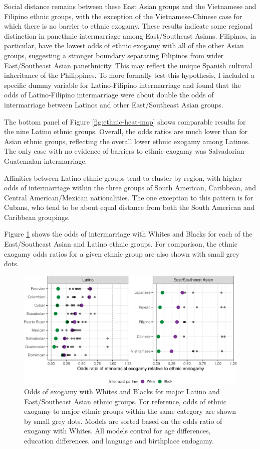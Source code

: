 \documentclass[11pt,]{article}
\begin{document}
Social distance remains between these East Asian groups and the Vietnamese and Filipino ethnic groups, with the exception of the Vietnamese-Chinese case for which there is no barrier to ethnic exogamy. These results indicate some regional distinction in panethnic intermarriage among East/Southeast Asians. Filipinos, in particular, have the lowest odds of ethnic exogamy with all of the other Asian groups, suggesting a stronger boundary separating Filipinos from wider East/Southeast Asian panethnicity. This may reflect the unique Spanish cultural inheritance of the Philippines. To more formally test this hypothesis, I included a specific dummy variable for Latino-Filipino intermarriage and found that the odds of Latino-Filipino intermarriage were about double the odds of intermarriage between Latinos and other East/Southeast Asian groups.

The bottom panel of Figure \ref{fig:ethnic-heat-map} shows comparable results for the nine Latino ethnic groups. Overall, the odds ratios are much lower than for Asian ethnic groups, reflecting the overall lower ethnic exogamy among Latinos. The only case with no evidence of barriers to ethnic exogamy was Salvadorian-Guatemalan intermarriage.

Affinities between Latino ethnic groups tend to cluster by region, with higher odds of intermarriage within the three groups of South American, Caribbean, and Central American/Mexican nationalities. The one exception to this pattern is for Cubans, who tend to be about equal distance from both the South American and Caribbean groupings.

Figure \ref{fig:racial-exogamy} shows the odds of intermarriage with Whites and Blacks for each of the East/Southeast Asian and Latino ethnic groups. For comparison, the ethnic exogamy odds ratios for a given ethnic group are also shown with small grey dots.

\begin{figure}
\centering
\includegraphics{main_files/figure-latex/racial-exogamy-1.pdf}
\caption{\label{fig:racial-exogamy}Odds of exogamy with Whites and Blacks for major Latino and East/Southeast Asian ethnic groups. For reference, odds of ethnic exogamy to major ethnic groups within the same category are shown by small grey dots. Models are sorted based on the odds ratio of exogamy with Whites. All models control for age differences, education differences, and language and birthplace endogamy.}
\end{figure}
\end{document}
